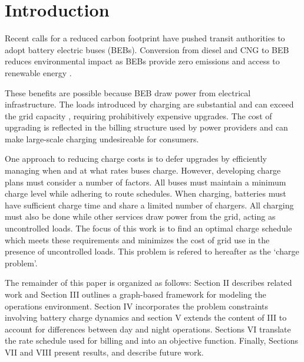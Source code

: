\section{Introduction}
Recent calls for a reduced carbon footprint have pushed transit authorities to adopt battery electric buses (BEBs). Conversion from diesel and CNG to BEB reduces environmental impact \cite{zhou_optimization_2018} as BEBs provide zero emissions and access to renewable energy \cite{poornesh_comparative_2020}. 
\par These benefits are possible because BEB draw power from electrical infrastructure. The loads introduced by charging are substantial and can exceed the grid capacity \cite{stahleder_impact_2019}\cite{deb_impact_2017}\cite{boonraksa_impact_2019}, requiring prohibitively expensive upgrades. The cost of upgrading is reflected in the billing structure used by power providers and can make large-scale charging undesireable for consumers. 
\par One approach to reducing charge costs is to defer upgrades by efficiently managing when and at what rates buses charge. However, developing charge plans must consider a number of factors. All buses must maintain a minimum charge level while adhering to route schedules. When charging, batteries must have sufficient charge time and share a limited number of chargers. All charging must also be done while other services draw power from the grid, acting as uncontrolled loads. The focus of this work is to find an optimal charge schedule which meets these requirements and minimizes the cost of grid use in the presence of uncontrolled loads. This problem is refered to hereafter as the `charge problem'.  
\par The remainder of this paper is organized as follows: Section II describes related work and Section III outlines a graph-based framework for modeling the operations environment. Section IV incorporates the problem constraints involving battery charge dynamics and section V extends the content of III to account for differences between day and night operations.  Sections VI translate the rate schedule used for billing and into an objective function. Finally, Sections VII and VIII present results, and describe future work.
